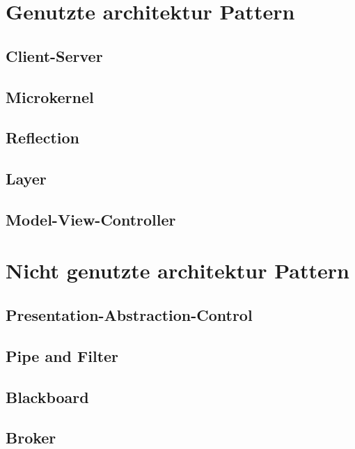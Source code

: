 \section{Genutzte architektur Pattern}
\subsection{Client-Server}

\subsection{Microkernel}

\subsection{Reflection}

\subsection{Layer}

\subsection{Model-View-Controller}

\clearpage
\section{Nicht genutzte architektur Pattern}
\subsection{Presentation-Abstraction-Control}

\subsection{Pipe and Filter}

\subsection{Blackboard}

\subsection{Broker}
